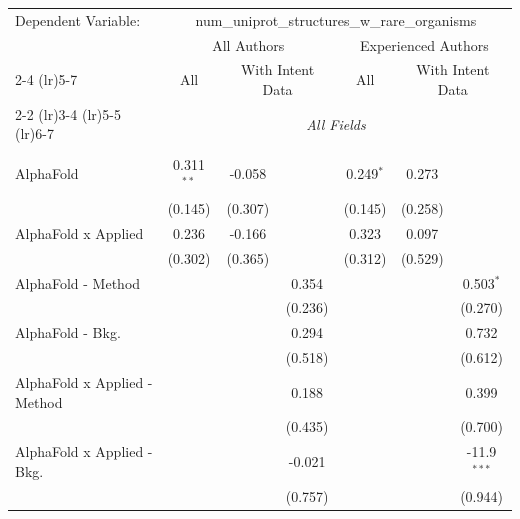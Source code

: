 \begingroup
\centering
\begin{tabular}{lcccccc}
   \tabularnewline \midrule \midrule
   Dependent Variable: & \multicolumn{6}{c}{num\_uniprot\_structures\_w\_rare\_organisms}\\
 & \multicolumn{3}{c}{All Authors} & \multicolumn{3}{c}{Experienced Authors} \\
\cmidrule(lr){2-4} \cmidrule(lr){5-7}
 & \multicolumn{1}{c}{All} & \multicolumn{2}{c}{With Intent Data} & \multicolumn{1}{c}{All} & \multicolumn{2}{c}{With Intent Data} \\
\cmidrule(lr){2-2} \cmidrule(lr){3-4} \cmidrule(lr){5-5} \cmidrule(lr){6-7}
 & \multicolumn{6}{c}{\textit{All Fields}} \\ \\
   AlphaFold                      & 0.311$^{**}$  & -0.058       &         & 0.249$^{*}$   & 0.273   &   \\   
                                  & (0.145)       & (0.307)      &         & (0.145)       & (0.258) &   \\   
   AlphaFold x Applied            & 0.236         & -0.166       &         & 0.323         & 0.097   &   \\   
                                  & (0.302)       & (0.365)      &         & (0.312)       & (0.529) &   \\   
   AlphaFold - Method             &               &              & 0.354   &               &         & 0.503$^{*}$\\   
                                  &               &              & (0.236) &               &         & (0.270)\\   
   AlphaFold - Bkg.               &               &              & 0.294   &               &         & 0.732\\   
                                  &               &              & (0.518) &               &         & (0.612)\\   
   AlphaFold x Applied - Method   &               &              & 0.188   &               &         & 0.399\\   
                                  &               &              & (0.435) &               &         & (0.700)\\   
   AlphaFold x Applied - Bkg.     &               &              & -0.021  &               &         & -11.9$^{***}$\\   
                                  &               &              & (0.757) &               &         & (0.944)\\   

\end{tabular}
